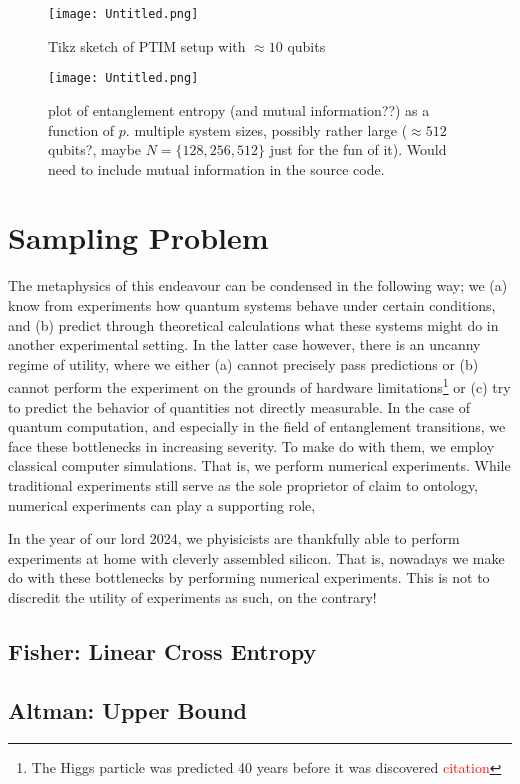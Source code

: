\begin{figure}[H]
  \centering
  \texttt{[image: Untitled.png]}
  \caption{Tikz sketch of PTIM setup with $\approx 10$ qubits}
  \label{fig:ptim-circuit}
\end{figure}

\begin{figure}[H]
  \centering
  \texttt{[image: Untitled.png]}
  \caption{plot of entanglement entropy (and mutual information??) as a
  function of $p$. multiple system sizes, possibly rather large ($\approx 512$
qubits?, maybe $N=\{128,256,512\}$ just for the fun of it). Would need to
include mutual information in the source code.}
  \label{fig:phase-transition}
\end{figure}

\section{Sampling Problem}\label{sec:sampling}
The metaphysics of this endeavour can
be condensed in the following way; we (a) know from experiments how quantum
systems behave under certain conditions, and (b) predict through theoretical
calculations what these systems might do in another experimental setting. In
the latter case however, there is an uncanny regime of utility, where we either
(a) cannot precisely pass predictions or (b) cannot perform the experiment on
the grounds of hardware limitations\footnote{The Higgs particle was predicted
40 years before it was discovered \textcolor{red}{citation}} or (c) try to
predict the behavior of quantities not directly measurable. In the case of
quantum computation, and especially in the field of entanglement transitions,
we face these bottlenecks in increasing severity. To make do with them, we
employ classical computer simulations. That is, we perform numerical
experiments. While traditional experiments still serve as the sole proprietor of claim to
ontology, numerical experiments can play a supporting role, 

In the year of our
lord 2024, we phyisicists are thankfully able to perform experiments at home
with cleverly assembled silicon.  That is, nowadays we make do with these
bottlenecks by performing numerical experiments. This is not to discredit the
utility of experiments as such, on the contrary! 

\subsection{Fisher: Linear Cross Entropy}
\cite{liCrossEntropyBenchmark2023}

\subsection{Altman: Upper Bound}
\cite{garrattProbingPostmeasurementEntanglement2024}
